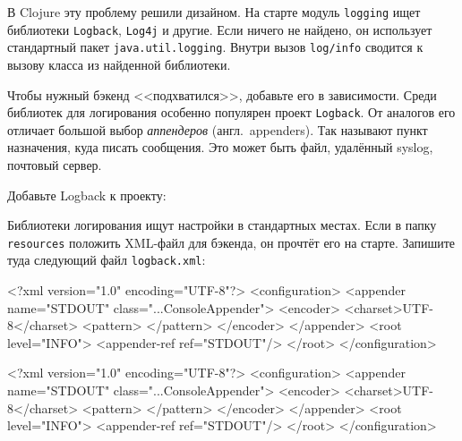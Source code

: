 
В Clojure эту проблему решили дизайном. На старте модуль \verb|logging| ищет
библиотеки \verb|Logback|, \verb|Log4j| и другие. Если ничего не найдено, он
использует стандартный пакет \verb|java.util.logging|. Внутри вызов
\verb|log/info| сводится к вызову класса из найденной библиотеки.

Чтобы нужный бэкенд <<подхватился>>, добавьте его в зависимости. Среди библиотек
для логирования особенно популярен проект \verb|Logback|. От аналогов его
отличает большой выбор \emph{аппендеров} (англ.~appenders). Так называют пункт
назначения, куда писать сообщения. Это может быть файл, удалённый syslog,
почтовый сервер.

\pagebreaklarge

Добавьте Logback к проекту:

\begin{english}
  \begin{clojure}
  \end{clojure}
\end{english}


Библиотеки логирования ищут настройки в стандартных местах. Если в папку
\verb|resources| положить XML-файл для бэкенда, он прочтёт его на
старте. Запишите туда следующий файл \verb|logback.xml|:

\ifnarrow

\begin{english}
  \begin{xml}
<?xml version="1.0" encoding="UTF-8"?>
<configuration>
  <appender name="STDOUT"
    class="...ConsoleAppender">
    <encoder>
      <charset>UTF-8</charset>
      <pattern>
      </pattern>
    </encoder>
  </appender>
  <root level="INFO">
    <appender-ref ref="STDOUT"/>
  </root>
</configuration>
  \end{xml}
\end{english}

\else

\begin{english}
  \begin{xml}
<?xml version="1.0" encoding="UTF-8"?>
<configuration>
  <appender name="STDOUT" class="...ConsoleAppender">
    <encoder>
      <charset>UTF-8</charset>
      <pattern>
      </pattern>
    </encoder>
  </appender>
  <root level="INFO">
    <appender-ref ref="STDOUT"/>
  </root>
</configuration>
  \end{xml}
\end{english}

